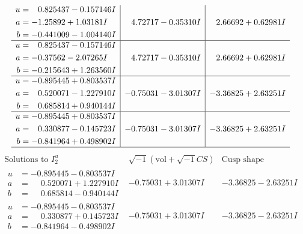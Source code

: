\documentclass[1p]{elsarticle_modified}
\theoremstyle{definition}
\newcommand{\I}{\sqrt{-1}}
\begin{document}
$$\begin{array}{c|c|c}
\begin{aligned}
u &= \phantom{-}0.825437 - 0.157146 I \\
a &= -1.25892 + 1.03181 I \\
b &= -0.441009 - 1.004140 I\end{aligned}
 & \phantom{-}4.72717 - 0.35310 I & \phantom{-}2.66692 + 0.62981 I \\ \hline\begin{aligned}
u &= \phantom{-}0.825437 - 0.157146 I \\
a &= -0.37562 - 2.07265 I \\
b &= -0.215643 + 1.263560 I\end{aligned}
 & \phantom{-}4.72717 - 0.35310 I & \phantom{-}2.66692 + 0.62981 I \\ \hline\begin{aligned}
u &= -0.895445 + 0.803537 I \\
a &= \phantom{-}0.520071 - 1.227910 I \\
b &= \phantom{-}0.685814 + 0.940144 I\end{aligned}
 & -0.75031 - 3.01307 I & -3.36825 + 2.63251 I \\ \hline\begin{aligned}
u &= -0.895445 + 0.803537 I \\
a &= \phantom{-}0.330877 - 0.145723 I \\
b &= -0.841964 + 0.498902 I\end{aligned}
 & -0.75031 - 3.01307 I & -3.36825 + 2.63251 I\\
 \hline 
 \end{array}$$\newpage$$\begin{array}{c|c|c}  
\text{Solutions to }I^u_{2}& \I (\text{vol} + \sqrt{-1}CS) & \text{Cusp shape}\\
 \hline 
\begin{aligned}
u &= -0.895445 - 0.803537 I \\
a &= \phantom{-}0.520071 + 1.227910 I \\
b &= \phantom{-}0.685814 - 0.940144 I\end{aligned}
 & -0.75031 + 3.01307 I & -3.36825 - 2.63251 I \\ \hline\begin{aligned}
u &= -0.895445 - 0.803537 I \\
a &= \phantom{-}0.330877 + 0.145723 I \\
b &= -0.841964 - 0.498902 I\end{aligned}
 & -0.75031 + 3.01307 I & -3.36825 - 2.63251 I \\ \hline\begin{aligned}

\end{aligned}
\end{array}$$
\end{document}
